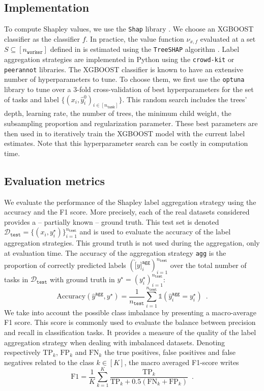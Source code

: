 \documentclass{cap2024}
\begin{document}
\subsection{Implementation}
\label{sub:implementation}

To compute Shapley values, we use the \texttt{Shap} library \citep{lundberg2017unified}.
We choose an XGBOOST classifier \citep{chen2016xgboost} as the classifier $f$.
In practice, the value function $\nu_{x,f}$ evaluated at a set $S\subseteq [n_\texttt{worker}]$ defined in  is estimated using the \texttt{TreeSHAP} algorithm \citep{lundberg2018consistent}.
Label aggregation strategies are implemented in Python using the \texttt{crowd-kit} \citep{CrowdKit2023} or \texttt{peerannot} \citep{peerannot} libraries.
The XGBOOST classifier is known to have an extensive number of hyperparameters to tune.
To choose them, we first use the \texttt{optuna} \citep{optuna} library to tune over a $3$-fold cross-validation of best hyperparameters for the set of tasks and label $\{(x_i, \hat{y}_i^0)_{i\in [n_\texttt{task}]}\}$.
This random search includes the trees' depth, learning rate, the number of trees, the minimum child weight, the subsampling proportion and regularization parameter. These best parameters are then used in  to iteratively train the XGBOOST model with the current label estimates. Note that this hyperparameter search can be costly in computation time.

\subsection{Evaluation metrics}

We evaluate the performance of the Shapley label aggregation strategy using the accuracy and the F1 score.
More precisely, each of the real datasets considered provides a -- partially known -- ground truth.
This test set is denoted $\mathcal{D}_\texttt{test}=\{(x_i, y_i^\star)\}_{i=1}^{n_\texttt{test}}$ and is used to evaluate the accuracy of the label aggregation strategies.
This ground truth is not used during the aggregation, only at evaluation time.
The accuracy of the aggregation strategy \texttt{agg} is the proportion of correctly predicted labels $(\hat[y]^\texttt{agg}_i)_{i=1}^{n_\texttt{test}}$ over the total number of tasks in $\mathcal{D}_\texttt{test}$ with ground truth in $y^\star=(y_i^\star)_{i=1}^{n_\texttt{test}}$:
\[\mathrm{Accuracy}(\hat{y}^\texttt{agg}, y^\star) = \frac{1}{n_\texttt{test}}\sum_{i=1}^{n_\texttt{test}} \mathds{1}(\hat{y}^\texttt{agg}_i=y_i^\star) \enspace.\]
We take into account the possible class imbalance by presenting a macro-average F1 score. This score is commonly used to evaluate the balance between precision and recall in classification tasks. It provides a measure of the quality of the label aggregation strategy when dealing with imbalanced datasets.
Denoting respectively $\mathrm{TP}_k$, $\mathrm{FP}_k$ and $\mathrm{FN}_k$ the true positives, false positives and false negatives related to the class $k\in[K]$, the macro averaged F1-score writes
\[
\mathrm{F1} = \frac{1}{K}\sum_{k=1}^K\frac{\mathrm{TP}_k}{\mathrm{TP}_k + 0.5(\mathrm{FN}_k + \mathrm{FP}_k)}\enspace.
\]
\end{document}
